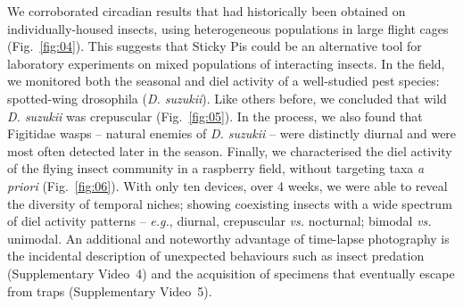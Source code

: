 \documentclass[12pt]{article}
\begin{document}
\begin{linenumbers}
		
		We corroborated circadian results that had historically been obtained on individually-housed insects, using heterogeneous populations in large flight cages (Fig.~\ref{fig:04}). This suggests that Sticky Pis could be an alternative tool for laboratory experiments on mixed populations of interacting insects. In the field, we monitored both the seasonal and diel activity of a well-studied pest species: spotted-wing drosophila (\emph{D. suzukii}). Like others before\cite{swoboda-bhattarai_diurnal_2020}, we concluded that wild \emph{D. suzukii} was crepuscular (Fig.~\ref{fig:05}). In the process, we also found that Figitidae wasps – natural enemies of \emph{D. suzukii} – were distinctly diurnal and were most often detected later in the season. Finally, we characterised the diel activity of the flying insect community in a raspberry field, without targeting taxa \emph{a priori} (Fig.~\ref{fig:06}). With only ten devices, over 4 weeks, we were able to reveal the diversity of temporal niches; showing coexisting insects with a wide spectrum of diel activity patterns – \emph{e.g.}, diurnal, crepuscular \emph{vs.} nocturnal; bimodal \emph{vs.} unimodal. An additional and noteworthy advantage of time-lapse photography is the incidental description of unexpected behaviours such as insect predation (Supplementary Video~4) and the acquisition of specimens that eventually escape from traps  (Supplementary Video~5).
		
		
		

\end{linenumbers}
\end{document}
